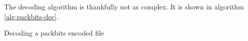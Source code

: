 The decoding algorithm is thankfully not as complex. It is shown in
algorithm \ref{alg:packbits-dec}.

\begin{algorithm}
  \caption{Decoding a \rle packbits encoded file}\algohack{}
  \label{alg:packbits-dec}
  \begin{algorithmic}[1]


    \While{\neof}



        \State {}
        \EndRepeatn
      \Else

        \State {}
        \EndRepeatn

      \EndIf


    \EndWhile
  \end{algorithmic}
\end{algorithm}

\FloatBarrier

\answers{}

